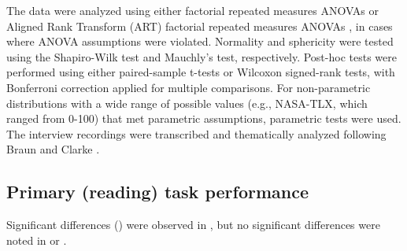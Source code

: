 The data were analyzed using either factorial repeated measures ANOVAs or Aligned Rank Transform (ART) factorial repeated measures ANOVAs \cite{wobbrock_aligned_2011}, in cases where ANOVA assumptions were violated. Normality and sphericity were tested using the Shapiro-Wilk test and Mauchly's test, respectively. Post-hoc tests were performed using either paired-sample t-tests or Wilcoxon signed-rank tests, with Bonferroni correction applied for multiple comparisons. For non-parametric distributions with a wide range of possible values (e.g., NASA-TLX, which ranged from 0-100) that met parametric assumptions, parametric tests were used. The interview recordings were transcribed and thematically analyzed following Braun and Clarke \cite{braun_using_2006}.














\subsection{Primary (reading) task performance}
\label{sec:GradNotif:study1:results_primary_task}

Significant differences () were observed in \readingTime{}, but no significant differences were noted in \readingAccuracy{} or \adjustedReadingAccuracy{}.

